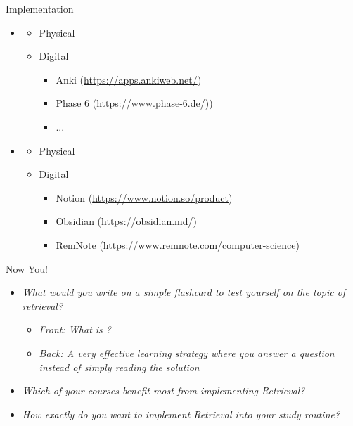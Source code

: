 \documentclass{ercisbeamer}
\begin{document}
\begin{frame}{Implementation}
    \begin{itemize}
        \item {}
        \begin{itemize}
            \item Physical
            \item Digital
            \begin{itemize}
                \item Anki (\url{https://apps.ankiweb.net/})
                \item Phase 6 (\url{https://www.phase-6.de/}))
                \item ...
            \end{itemize}
        \end{itemize}
        \item {}
        \begin{itemize}
            \item Physical
            \item Digital 
            \begin{itemize}
                \item Notion (\url{https://www.notion.so/product})
                \item Obsidian (\url{https://obsidian.md/})
                \item RemNote (\url{https://www.remnote.com/computer-science})
            \end{itemize}
        \end{itemize}
    \end{itemize}
\end{frame}

\begin{frame}{Now You!}
    \begin{itemize}
        \item \emph{What would you write on a simple flashcard to test yourself on the topic of retrieval?} \pause
        \begin{itemize}
            \item \emph{Front: What is ?}
            \item \emph{Back: A very effective learning strategy where you answer a question instead of simply reading the solution}
        \end{itemize}
        \item \emph{Which of your courses benefit most from implementing Retrieval?}
        \item \emph{How exactly do you want to implement Retrieval into your study routine?}
    \end{itemize}
\end{frame}
\end{document}

